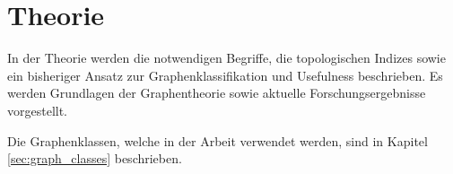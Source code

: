 \chapter{Theorie} \label{chap:graph_theory}

In der Theorie werden die notwendigen Begriffe, die topologischen Indizes sowie ein bisheriger Ansatz zur Graphenklassifikation und Usefulness beschrieben.
Es werden Grundlagen der Graphentheorie sowie aktuelle Forschungsergebnisse vorgestellt.

Die Graphenklassen, welche in der Arbeit verwendet werden, sind in Kapitel \ref{sec:graph_classes} beschrieben.

\newpage





\newpage


\newpage

